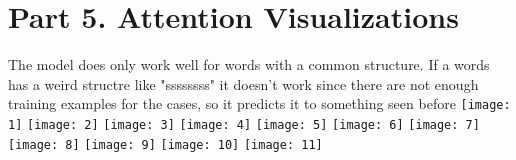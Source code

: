 \documentclass{article}
\begin{document}
\section{Part 5. Attention Visualizations}
The model does only work well for words with a common structure. If a words has a weird structre like "ssssssss" it doesn't work since there are not enough training examples for the cases, so it predicts it to something seen before
\texttt{[image: 1]}
\texttt{[image: 2]}
\texttt{[image: 3]}
\texttt{[image: 4]}
\texttt{[image: 5]}
\texttt{[image: 6]}
\texttt{[image: 7]}
\texttt{[image: 8]}
\texttt{[image: 9]}
\texttt{[image: 10]}
\texttt{[image: 11]}
\end{document}
